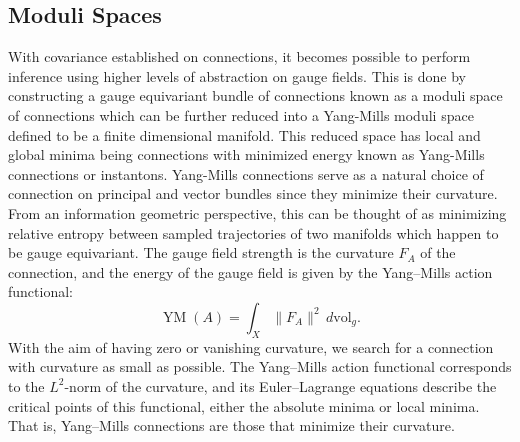\documentclass{article}
\begin{document}
\subsection{Moduli Spaces}
    With covariance established on connections, it becomes possible to perform inference using higher levels of abstraction on gauge fields. This is done by constructing a gauge equivariant bundle of connections known as a moduli space of connections which  can be further reduced into a Yang-Mills moduli space defined to be a finite dimensional manifold. This reduced space has local and global minima being connections with minimized energy known as Yang-Mills connections or instantons. Yang-Mills connections serve as a natural choice of connection on principal and vector bundles since they minimize their curvature. From an information geometric perspective, this can be thought of as minimizing relative entropy between sampled trajectories of two manifolds which happen to be gauge equivariant. The gauge field strength is the curvature $F_{A}$ of the connection, and the energy of the gauge field is given by the Yang–Mills action functional:
    \[
    {\displaystyle \operatorname {YM} (A)=\int _{X}\|F_{A}\|^{2}\,d\mathrm {vol} _{g}.}
    \]
    With the aim of having zero or vanishing curvature, we search for a connection with curvature as small as possible. The Yang–Mills action functional corresponds to the $L^{2}$-norm of the curvature, and its Euler–Lagrange equations describe the critical points of this functional, either the absolute minima or local minima. That is, Yang–Mills connections are those that minimize their curvature.  
\end{document}
